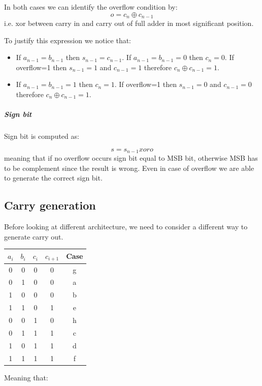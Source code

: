 In both cases we can identify the overflow condition by:
$$o=c_n  \oplus c_{n-1} $$
i.e. xor between carry in and carry out of full adder in most significant position.

To justify this expression we notice that:
\begin{itemize}
  \item
    \subitem If $a_{n-1}=b_{n-1}$ then $s_{n-1}=c_{n-1}$.
    \subitem If $a_{n-1}=b_{n-1}=0$ then $c_n=0$.
  If overflow=1 then $s_{n-1}=1$ and $c_{n-1}=1$ therefore $c_n \oplus c_{n-1}=1$.

  \item
    \subitem If $a_{n-1}=b_{n-1}=1$ then $c_n=1$.
  If overflow=1 then $s_{n-1}=0$ and $c_{n-1}=0$ therefore $c_n \oplus c_{n-1}=1$.

\end{itemize}

\subparagraph{Sign bit}
Sign bit is computed as:

$$s=s_{n-1} xor o $$
meaning that if no overflow occurs sign bit equal to MSB bit, otherwise MSB has to be complement since the result is wrong. Even in case of overflow we are able to generate the correct sign bit.

\subsection{Carry generation}
Before looking at different architecture, we need to consider a different way to generate carry out.

\begin{center}
  \begin{tabular}{|c|c|c|c|c|}
    \hline
     $a_i$& $b_i$&    $c_i$&    $c_{i+1}$& Case\\
     \hline
      0&    0&    0&    0&    g\\
      0&    1&    0&    0&    a\\
      1&    0&    0&    0&    b\\
      1&    1&    0&    1&    e\\
      0&    0&    1&    0&    h\\
      0&    1&    1&    1&    c\\
      1&    0&    1&    1&    d\\
      1&    1&    1&    1&    f\\
    \hline
  \end{tabular}
\end{center}

Meaning that:

